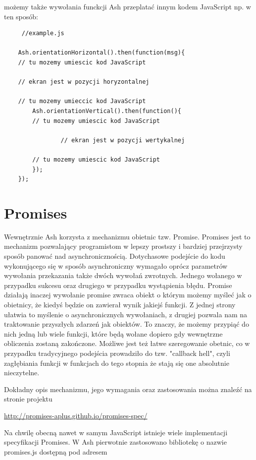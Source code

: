 \documentclass[brudnopis]{xmgr}
\begin{document}
możemy także wywołania funckcji Ash przeplatać innym kodem JavaScript np. w ten sposób:

\begin{lstlisting}
     //example.js

    Ash.orientationHorizontal().then(function(msg){
	// tu mozemy umiescic kod JavaScript
      	
	// ekran jest w pozycji horyzontalnej
      
	// tu mozemy umieccic kod JavaScript
      	Ash.orientationVertical().then(function(){
		// tu mozemy umiescic kod JavaScript

        		// ekran jest w pozycji wertykalnej 

		// tu mozemy umiescic kod JavaScript
      	});
    });
\end{lstlisting}

\section{Promises}

Wewnętrznie Ash korzysta z mechanizmu obietnic tzw. Promise. Promises jest to mechanizm pozwalający programistom w lepszy prostszy i bardziej przejrzysty sposób panować nad  asynchronicznością. Dotychasowe podejście do kodu wykonującego się w sposób asynchroniczny wymagało oprócz parametrów wywołania przekazania także dwóch wywołań zwrotnych. Jednego wołanego w przypadku sukcesu oraz drugiego w przypadku wystąpienia błędu. Promise działają inaczej wywołanie promise zwraca obiekt o którym możemy myśleć jak o obietnicy, że kiedyś będzie on zawierał wynik jakiejś funkcji. Z jednej strony ułatwia to myślenie o asynchronicznych wywołaniach, z drugiej pozwala nam na traktowanie przyszłych zdarzeń jak obiektów. To znaczy, że możemy przypiąć do nich jedną lub wiele funkcji, które będą wołane dopiero gdy wewnętrzne obliczenia zostaną zakończone. Możliwe jest też łatwe szeregowanie obetnic, co w przypadku tradycyjnego podejścia prowadziło do tzw. "callback hell", czyli zagłębiania funkcji w funkcjach do tego stopnia że stają się one absolutnie nieczytelne. 

Dokładny opis mechanizmu, jego wymagania oraz zastosowania można znaleźć na  stronie projektu

\url{http://promises-aplus.github.io/promises-spec/}

Na chwilę obecną nawet w samym JavaScript istnieje wiele implementacji specyfikacji Promises. W Ash pierwotnie zastosowano bibliotekę o nazwie promises.js dostępną pod adresem
\end{document}
